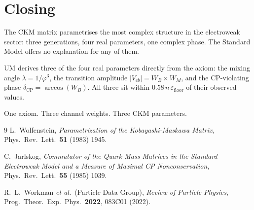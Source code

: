 \documentclass[12pt]{article}
\begin{document}
\section*{Closing}

The CKM matrix parametrises the most complex structure in the electroweak
sector: three generations, four real parameters, one complex phase. The
Standard Model offers no explanation for any of them.

UM derives three of the four real parameters directly from the axiom: the
mixing angle $\lambda = 1/\varphi^3$, the transition amplitude
$|V_{cb}| = W_B \times W_M$, and the CP-violating phase
$\delta_{\text{CP}} = \arccos(W_B)$. All three sit within
$0.58\,n\,\varepsilon_{\text{floor}}$ of their observed values.

One axiom. Three channel weights. Three CKM parameters.

\begin{thebibliography}{9}
L.~Wolfenstein,
\textit{Parametrization of the Kobayashi-Maskawa Matrix},
Phys.\ Rev.\ Lett.\ \textbf{51} (1983) 1945.

C.~Jarlskog,
\textit{Commutator of the Quark Mass Matrices in the Standard Electroweak Model and a Measure of Maximal CP Nonconservation},
Phys.\ Rev.\ Lett.\ \textbf{55} (1985) 1039.

R.~L.~Workman \textit{et al.}\ (Particle Data Group),
\textit{Review of Particle Physics},
Prog.\ Theor.\ Exp.\ Phys.\ \textbf{2022}, 083C01 (2022).
\end{thebibliography}
\end{document}
